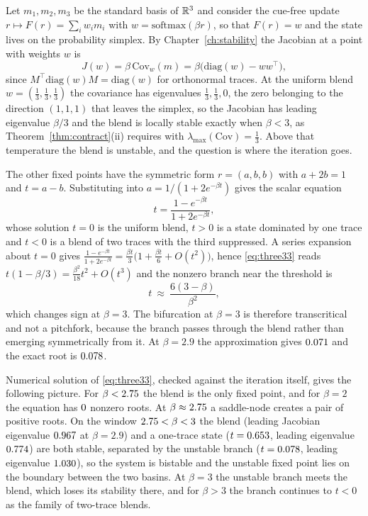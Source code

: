 \begin{workedex}\label{ex:three33}
Let $m_1,m_2,m_3$ be the standard basis of $\mathbb{R}^3$ and consider the cue-free update $r\mapsto F(r)=\sum_iw_im_i$ with $w=\mathrm{softmax}(\beta r)$, so that $F(r)=w$ and the state lives on the probability simplex. By Chapter~\ref{ch:stability} the Jacobian at a point with weights $w$ is
\begin{equation}
J(w)=\beta\,\mathrm{Cov}_w(m)=\beta\bigl(\mathrm{diag}(w)-ww^{\top}\bigr),
\end{equation}
since $M^{\top}\mathrm{diag}(w)M=\mathrm{diag}(w)$ for orthonormal traces. At the uniform blend $w=(\tfrac13,\tfrac13,\tfrac13)$ the covariance has eigenvalues $\tfrac13,\tfrac13,0$, the zero belonging to the direction $(1,1,1)$ that leaves the simplex, so the Jacobian has leading eigenvalue $\beta/3$ and the blend is locally stable exactly when $\beta<3$, as Theorem~\ref{thm:contract}(ii) requires with $\lambda_{\max}(\mathrm{Cov})=\tfrac13$. Above that temperature the blend is unstable, and the question is where the iteration goes.

The other fixed points have the symmetric form $r=(a,b,b)$ with $a+2b=1$ and $t=a-b$. Substituting into $a=1/(1+2e^{-\beta t})$ gives the scalar equation
\begin{equation}\label{eq:three33}
t=\frac{1-e^{-\beta t}}{1+2e^{-\beta t}},
\end{equation}
whose solution $t=0$ is the uniform blend, $t>0$ is a state dominated by one trace and $t<0$ is a blend of two traces with the third suppressed. A series expansion about $t=0$ gives $\tfrac{1-e^{-\beta t}}{1+2e^{-\beta t}}=\tfrac{\beta t}{3}\bigl(1+\tfrac{\beta t}{6}+O(t^2)\bigr)$, hence \eqref{eq:three33} reads $t(1-\beta/3)=\tfrac{\beta^2}{18}t^2+O(t^3)$ and the nonzero branch near the threshold is
\begin{equation}
t\ \approx\ \frac{6(3-\beta)}{\beta^2},
\end{equation}
which changes sign at $\beta=3$. The bifurcation at $\beta=3$ is therefore transcritical and not a pitchfork, because the branch passes through the blend rather than emerging symmetrically from it. At $\beta=2.9$ the approximation gives $0.071$ and the exact root is $0.078$.

Numerical solution of \eqref{eq:three33}, checked against the iteration itself, gives the following picture. For $\beta<2.75$ the blend is the only fixed point, and for $\beta=2$ the equation has $0$ nonzero roots. At $\beta\approx2.75$ a saddle-node creates a pair of positive roots. On the window $2.75<\beta<3$ the blend (leading Jacobian eigenvalue $0.967$ at $\beta=2.9$) and a one-trace state ($t=0.653$, leading eigenvalue $0.774$) are both stable, separated by the unstable branch ($t=0.078$, leading eigenvalue $1.030$), so the system is bistable and the unstable fixed point lies on the boundary between the two basins. At $\beta=3$ the unstable branch meets the blend, which loses its stability there, and for $\beta>3$ the branch continues to $t<0$ as the family of two-trace blends.


\end{workedex}
